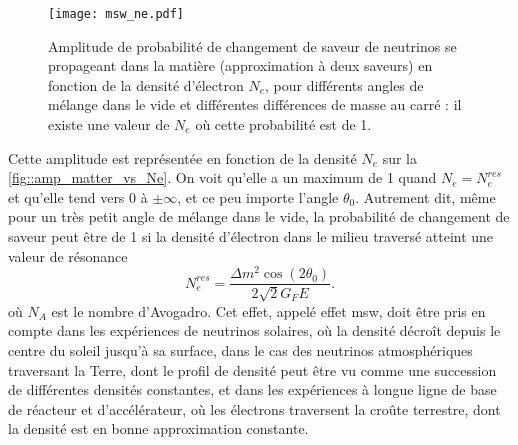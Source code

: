         \begin{figure}[!htb]
          \centering
          \texttt{[image: msw\_ne.pdf]}
          \caption[L'effet de résonnance MSW]{\label{fig::amp_matter_vs_Ne}Amplitude de probabilité de changement de saveur de neutrinos se propageant dans la matière (approximation à deux saveurs) en fonction de la densité d'électron $N_e$, pour différents angles de mélange dans le vide et différentes différences de masse au carré : il existe une valeur de $N_e$ où cette probabilité est de 1.}
        \end{figure}
        Cette amplitude est représentée en fonction de la densité $N_e$ sur la \autoref{fig::amp_matter_vs_Ne}. On voit qu'elle a un maximum de 1 quand $N_e = N_e^{res}$ et qu'elle tend vers 0 à $\pm\infty$, et ce peu importe l'angle $\theta_0$. Autrement dit, même pour un très petit angle de mélange dans le vide, la probabilité de changement de saveur peut être de 1 si la densité d'électron dans le milieu traversé atteint une valeur de résonance
        \begin{equation}\label{eq::MSW_condition}
          N_e^{res}  =\frac{\Delta m^2\cos(2\theta_0)}{2\sqrt{2}G_F E}.
        \end{equation}
        où $N_A$ est le nombre d'Avogadro.
        Cet effet, appelé effet \gls{msw}, doit être pris en compte dans les expériences de neutrinos solaires, où la densité décroît depuis le centre du soleil jusqu'à sa surface, dans le cas des neutrinos atmosphériques traversant la Terre, dont le profil de densité peut être vu comme une succession de différentes densités constantes, et dans les expériences à longue ligne de base de réacteur et d'accélérateur, où les électrons traversent la croûte terrestre, dont la densité est en bonne approximation constante.
        
        
